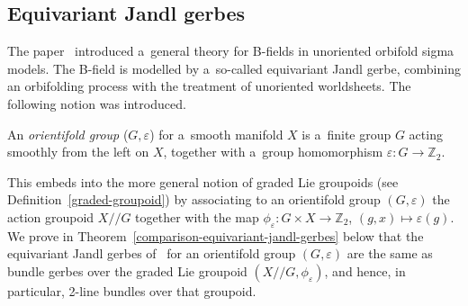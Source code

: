 \documentclass[pdftex]{sigma}
\numberwithin{equation}{section}
\def\Z {\mathbb{Z}}
\def\act#1#2{#1/\!\!/#2}
\begin{document}
\subsection{Equivariant Jandl gerbes}
\label{equivariant-Jandl-gerbes}

The paper~\cite{gawedzki8} introduced a~general theory for B-fields in unoriented orbifold sigma models. The B-field is modelled by a~so-called equivariant Jandl gerbe, combining an orbifolding process with the treatment of unoriented worldsheets. The following notion was introduced.

\begin{Definition}
 An \emph{orientifold group} ($G,\varepsilon$) for a~smooth manifold $X$ is a~finite group $G$ acting smoothly from the left on $X$,
 together with a~group homomorphism $\varepsilon\colon G \to \mathbb{Z}_2$.
\end{Definition}

This embeds into the more general notion of graded Lie groupoids (see Definition~\ref{graded-groupoid}) by associating to an orientifold group $(G,\varepsilon)$ the action groupoid $\act XG$ together with the map $\phi_{\varepsilon}\colon G \times X \to \Z_2$, $(g,x)\mapsto \varepsilon(g)$.
We prove in Theorem~\ref{comparison-equivariant-jandl-gerbes} below that the equivariant Jandl gerbes of~\cite{gawedzki8} for an orientifold group $(G,\varepsilon)$ are the same as bundle gerbes over the graded Lie groupoid $(\act XG,\phi_{\varepsilon})$, and hence, in particular, 2-line bundles over that groupoid.
\end{document}
